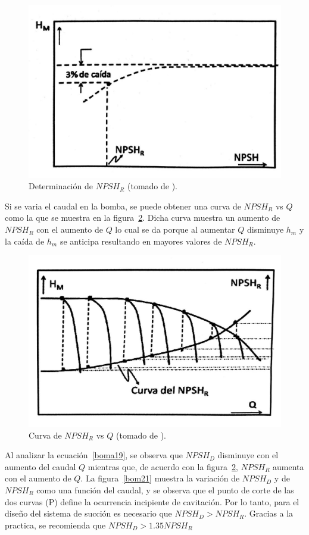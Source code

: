 \documentclass[11pt, oneside]{article}
\begin{document}
\begin{figure}[h]
\centering
\includegraphics[width=12cm]{./figs/bom19.jpeg}
\caption{Determinaci\'on de $NPSH_R$ (tomado de \cite{agudelo2011mecanica}).} 
\label{bom19}
\end{figure}

Si se varia el caudal en la bomba, se puede obtener una curva de $NPSH_R$ vs $Q$ como la que se muestra en la figura~\ref{bom20}. Dicha curva muestra un aumento de $NPSH_R$ con el aumento de $Q$ lo cual se da porque al aumentar $Q$ disminuye $h_m$ y la ca\'ida de $h_m$ se anticipa resultando en mayores valores de $NPSH_R$.  

\begin{figure}[h]
\centering
\includegraphics[width=12cm]{./figs/bom20.jpeg}
\caption{Curva de $NPSH_R$ vs $Q$ (tomado de \cite{agudelo2011mecanica}).} 
\label{bom20}
\end{figure}

Al analizar la ecuaci\'on~\ref{boma19}, se observa que $NPSH_D$ disminuye con el aumento del caudal $Q$ mientras que, de acuerdo con la figura~\ref{bom20}, $NPSH_R$ aumenta con el aumento de $Q$. La figura~\ref{bom21}  muestra la variaci\'on de $NPSH_D$ y de $NPSH_R$ como una funci\'on del caudal, y se observa que el punto de corte de las dos curvas (P) define la ocurrencia incipiente de cavitaci\'on. Por lo tanto, para el dise\~no del sistema de succi\'on es necesario que $NPSH_D > NPSH_R$. Gracias a la practica, se recomienda que $NPSH_D > 1.35 NPSH_R$
\end{document}
